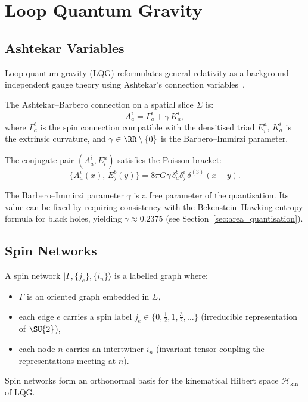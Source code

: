 \section{Loop Quantum Gravity}
\label{sec:lqg}

\subsection{Ashtekar Variables}

Loop quantum gravity (LQG) reformulates general relativity as a
background-independent gauge theory using Ashtekar's
connection variables~\cite{ashtekar1986new, rovelli2004quantum}.

\begin{definition}
\label{def:ashtekar}
The Ashtekar--Barbero connection on a spatial slice $\Sigma$ is:
\begin{equation}
A_a^i = \Gamma_a^i + \gamma\, K_a^i,
\end{equation}
where $\Gamma_a^i$ is the spin connection compatible with the densitised
triad $E^a_i$, $K_a^i$ is the extrinsic curvature, and
$\gamma \in \RR \setminus \{0\}$ is the Barbero--Immirzi parameter.

The conjugate pair $(A_a^i, E^a_i)$ satisfies the Poisson bracket:
\begin{equation}
\{A_a^i(x),\, E^b_j(y)\} = 8\pi G \gamma\, \delta_a^b \delta^i_j\,
\delta^{(3)}(x - y).
\end{equation}
\end{definition}

\begin{remark}
The Barbero--Immirzi parameter $\gamma$ is a free parameter of the
quantisation.  Its value can be fixed by requiring consistency with the
Bekenstein--Hawking entropy formula for black holes, yielding
$\gamma \approx 0.2375$ (see Section~\ref{sec:area_quantisation}).
\end{remark}

\subsection{Spin Networks}

\begin{definition}
\label{def:spin_network}
A spin network $|\Gamma, \{j_e\}, \{i_n\}\rangle$ is a labelled graph
where:
\begin{itemize}
    \item $\Gamma$ is an oriented graph embedded in $\Sigma$,
    \item each edge $e$ carries a spin label $j_e \in \{0, \tfrac{1}{2},
          1, \tfrac{3}{2}, \ldots\}$ (irreducible representation of
          $\SU{2}$),
    \item each node $n$ carries an intertwiner $i_n$ (invariant tensor
          coupling the representations meeting at $n$).
\end{itemize}
Spin networks form an orthonormal basis for the kinematical Hilbert space
$\mathcal{H}_{\mathrm{kin}}$ of LQG.
\end{definition}

